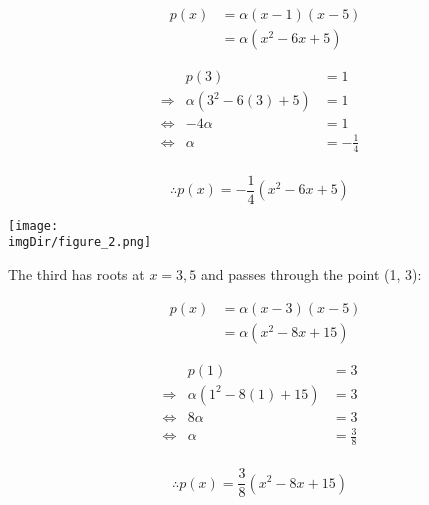 \documentclass[MathsNotesBase.tex]{subfiles}
\begin{document}
{	\begin{par}
	$$\begin{array}{lcr}
	&p(x) &= \alpha(x-1)(x-5)\\
	&&= \alpha(x^2-6x+5)
	\end{array}$$
	\end{par}
	
	\begin{par}
	$$\begin{array}{lcr}
	&p(3)&=1 \\
	\Longrightarrow &\alpha(3^2-6(3) + 5) &= 1 \\
	\iff &-4\alpha&=1\\
	\iff &\alpha &= -\frac{1}{4}\\
	\end{array}$$
	\end{par}
	
	\begin{par}
	$$\therefore p(x) = -\frac{1}{4}(x^2-6x+5)$$
	\end{par}
	
	
	\begin{center}
	\texttt{[image: \\imgDir/figure\_2.png]}
	\end{center}
	
	
	\begin{par}
	\begin{flushleft}
	The third has roots at $x=3,5$ and passes through the point (1, 3):
	\end{flushleft}
	\end{par}
	
	\begin{par}
	$$\begin{array}{lcr}
	&p(x) &= \alpha(x-3)(x-5)\\
	&&= \alpha(x^2-8x+15)
	\end{array}$$
	\end{par}
	
	\begin{par}
	$$\begin{array}{lcr}
	&p(1)&=3 \\
	\Longrightarrow &\alpha(1^2-8(1) + 15) &= 3 \\
	\iff &8\alpha&=3\\
	\iff &\alpha &= \frac{3}{8}\\
	\end{array}$$
	\end{par}
	
	\begin{par}
	$$\therefore p(x) = \frac{3}{8}(x^2-8x+15)$$
	\end{par}
	
}
\end{document}
